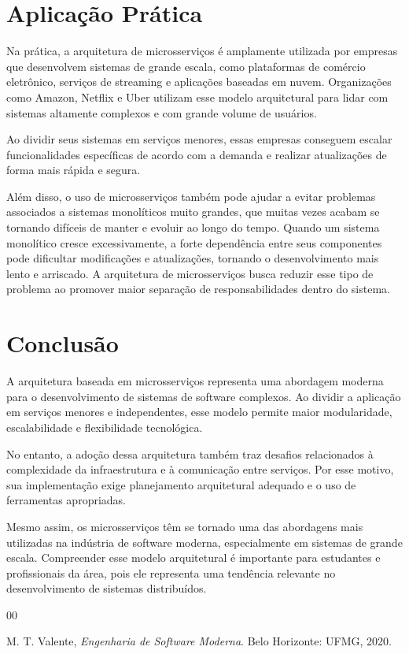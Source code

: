 \documentclass[conference]{IEEEtran}
\begin{document}
\section{Aplicação Prática}

Na prática, a arquitetura de microsserviços é amplamente utilizada por empresas que desenvolvem sistemas de grande escala, como plataformas de comércio eletrônico, serviços de streaming e aplicações baseadas em nuvem. Organizações como Amazon, Netflix e Uber utilizam esse modelo arquitetural para lidar com sistemas altamente complexos e com grande volume de usuários.

Ao dividir seus sistemas em serviços menores, essas empresas conseguem escalar funcionalidades específicas de acordo com a demanda e realizar atualizações de forma mais rápida e segura.

Além disso, o uso de microsserviços também pode ajudar a evitar problemas associados a sistemas monolíticos muito grandes, que muitas vezes acabam se tornando difíceis de manter e evoluir ao longo do tempo. Quando um sistema monolítico cresce excessivamente, a forte dependência entre seus componentes pode dificultar modificações e atualizações, tornando o desenvolvimento mais lento e arriscado. A arquitetura de microsserviços busca reduzir esse tipo de problema ao promover maior separação de responsabilidades dentro do sistema.

\section{Conclusão}

A arquitetura baseada em microsserviços representa uma abordagem moderna para o desenvolvimento de sistemas de software complexos. Ao dividir a aplicação em serviços menores e independentes, esse modelo permite maior modularidade, escalabilidade e flexibilidade tecnológica.

No entanto, a adoção dessa arquitetura também traz desafios relacionados à complexidade da infraestrutura e à comunicação entre serviços. Por esse motivo, sua implementação exige planejamento arquitetural adequado e o uso de ferramentas apropriadas.

Mesmo assim, os microsserviços têm se tornado uma das abordagens mais utilizadas na indústria de software moderna, especialmente em sistemas de grande escala. Compreender esse modelo arquitetural é importante para estudantes e profissionais da área, pois ele representa uma tendência relevante no desenvolvimento de sistemas distribuídos.

\begin{thebibliography}{00}

M. T. Valente,
\textit{Engenharia de Software Moderna}.
Belo Horizonte: UFMG, 2020.

\end{thebibliography}
\end{document}
